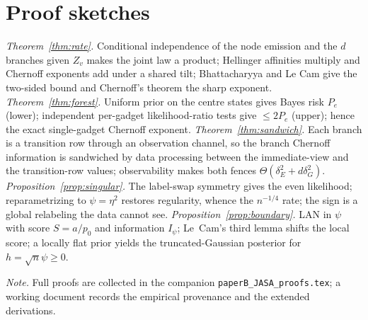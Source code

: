 \documentclass[11pt]{article}
\theoremstyle{plain}
\theoremstyle{definition}\newtheorem{definition}{Definition}\newtheorem{assumption}{Assumption}
\begin{document}
\section{Proof sketches}
\emph{Theorem~\ref{thm:rate}.} Conditional independence of the node emission and the $d$ branches given $Z_v$ makes
the joint law a product; Hellinger affinities multiply and Chernoff exponents add under a shared tilt; Bhattacharyya
and Le Cam give the two-sided bound and Chernoff's theorem the sharp exponent.\quad
\emph{Theorem~\ref{thm:forest}.} Uniform prior on the centre states gives Bayes risk $P_e$ (lower); independent
per-gadget likelihood-ratio tests give $\le 2P_e$ (upper); hence the exact single-gadget Chernoff exponent.\quad
\emph{Theorem~\ref{thm:sandwich}.} Each branch is a transition row through an observation channel, so the branch
Chernoff information is sandwiched by data processing between the immediate-view and the transition-row values;
observability makes both fences $\Theta(\delta_E^2+d\delta_G^2)$.\quad
\emph{Proposition~\ref{prop:singular}.} The label-swap symmetry gives the even likelihood; reparametrizing to
$\psi=\eta^2$ restores regularity, whence the $n^{-1/4}$ rate; the sign is a global relabeling the data cannot
see.\quad
\emph{Proposition~\ref{prop:boundary}.} LAN in $\psi$ with score $S=a/p_0$ and information $I_\psi$; Le~Cam's third
lemma shifts the local score; a locally flat prior yields the truncated-Gaussian posterior for $h=\sqrt n\psi\ge0$.

\smallskip\noindent\footnotesize\emph{Note.} Full proofs are collected in the companion \texttt{paperB\_JASA\_proofs.tex}; a working document
records the empirical provenance and the extended derivations.
\normalsize
\end{document}

